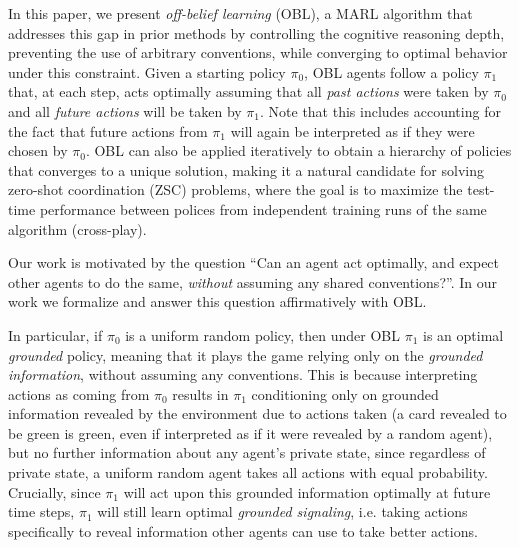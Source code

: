 In this paper, we present \emph{off-belief learning} (OBL), a MARL algorithm that addresses this gap in prior methods by controlling the cognitive reasoning depth, preventing the use of arbitrary conventions, while converging to optimal behavior under this constraint. Given a starting policy $\pi_0$, OBL agents follow a policy $\pi_1$ that, at each step, acts optimally assuming that all \emph{past actions} were taken by $\pi_0$ and all \emph{future actions} will be taken by $\pi_1$. Note that this includes accounting for the fact that future actions from $\pi_1$ will again be interpreted as if they were chosen by $\pi_0$. OBL can also be applied iteratively to obtain a hierarchy of policies that converges to a unique solution, making it a natural candidate for solving zero-shot coordination (ZSC) problems, where the goal is to maximize the test-time performance between polices from independent training runs of the same algorithm (cross-play).

Our work is motivated by the question ``Can an agent act optimally, and expect other agents to do the same, \emph{without} assuming any shared conventions?''. In our work we formalize and answer this question affirmatively with OBL.


In particular, if $\pi_0$ is a uniform random policy, then under OBL $\pi_1$ is an optimal \emph{grounded} policy, meaning that it plays the game relying only on the \emph{grounded information}, without assuming any conventions.
This is because interpreting actions as coming from $\pi_0$ results in $\pi_1$ conditioning only on grounded information revealed by the environment due to actions taken (a card revealed to be green is green, even if interpreted as if it were revealed by a random agent), but no further information about any agent's private state, since regardless of private state, a uniform random agent takes all actions with equal probability.
Crucially, since $\pi_1$ will act upon this grounded information optimally at future time steps, $\pi_1$ will still learn optimal \emph{grounded signaling}, i.e. taking actions specifically to reveal information other agents can use to take better actions.

